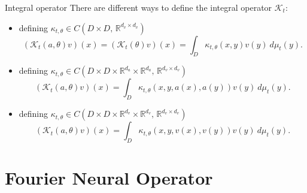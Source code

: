 \documentclass{beamer}
\newcommand{\numberset}{\mathbb}
\newcommand{\R}{\numberset{R}}
\begin{document}
\begin{frame}{Integral operator}
	There are different ways to define the integral operator $ \mathcal{K}_t $:
	\begin{itemize}
		\item defining $ \kappa_{t,\theta} \in C(D\times D,\, \R^{d_{v}\times d_{v}}) $
		\[ (\mathcal{K}_t(a, \theta)v)(x) = (\mathcal{K}_t(\theta)v)(x) = \int_{D} \kappa_{t,\theta}(x, y) v(y) \ d\mu_t(y).\]
		\pause
		\item defining $ \kappa_{t,\theta} \in C(D\times D\times \R^{d_a} \times \R^{d_a},\, \R^{d_{v}\times d_{v}}) $
		\[	(\mathcal{K}_t(a, \theta)v)(x) = \int_{D} \kappa_{t, \theta}\left( x, y, a\left(x\right), a\left(y\right) \right)v(y)  \ d\mu_t(y).\]
		\pause
		\item defining $ \kappa_{t,\theta} \in C(D\times D\times \R^{d_{v}} \times \R^{d_{v}},\, \R^{d_{v}\times d_{v}}) $
		\[ (\mathcal{K}_t(a, \theta)v)(x) = \int_{D} \kappa_{t,\theta}\left( x, y, v\left(x\right), v(y) \right) v(y)  \ d\mu_t(y). \]
	\end{itemize}
\end{frame}



\section{Fourier Neural Operator}
\end{document}
